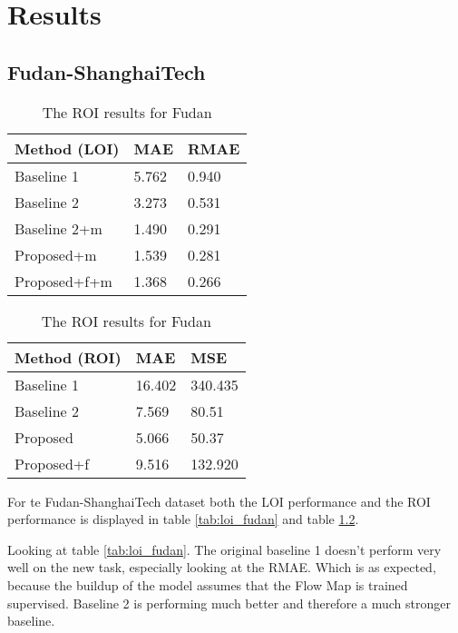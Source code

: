 \chapter{Results}

\section{Fudan-ShanghaiTech}

\begin{table}[!htb]
	\begin{minipage}{.5\linewidth}
      \centering
		\begin{tabular}{lll}
		\hline
		Method (LOI)                               & MAE & RMAE \\ \hline
		\multicolumn{1}{l|}{Baseline 1}          & 5.762 & 0.940 \\
		\multicolumn{1}{l|}{Baseline 2}          & 3.273 & 0.531 \\
		\multicolumn{1}{l|}{Baseline 2+m}      & 1.490 & 0.291 \\
		\multicolumn{1}{l|}{Proposed+m}        	 & 1.539 & 0.281 \\
		\multicolumn{1}{l|}{Proposed+f+m} & 1.368 & 0.266 \\ \hline
		\end{tabular}
		\caption{\label{tab:loi_fudan}The LOI results for Fudan}
	\end{minipage}
	\begin{minipage}{.5\linewidth}
      \centering
		\begin{tabular}{lll}
		\hline
		Method (ROI)                               & MAE & MSE \\ \hline
		\multicolumn{1}{l|}{Baseline 1}          & 16.402 & 340.435 \\
		\multicolumn{1}{l|}{Baseline 2}          & 7.569 & 80.51 \\
		\multicolumn{1}{l|}{Proposed}        	 & 5.066 & 50.37 \\
		\multicolumn{1}{l|}{Proposed+f} 		 & 9.516 & 132.920 \\ \hline
		\end{tabular}
		\caption{\label{tab:roi_fudan}The ROI results for Fudan}
	\end{minipage}
\end{table}

For te Fudan-ShanghaiTech dataset both the LOI performance and the ROI performance is displayed in table \ref{tab:loi_fudan} and table \ref{tab:roi_fudan}.

Looking at table \ref{tab:loi_fudan}. The original baseline 1 doesn't perform very well on the new task, especially looking at the RMAE. Which is as expected, because the buildup of the model assumes that the Flow Map is trained supervised. Baseline 2 is performing much better and therefore a much stronger baseline.

